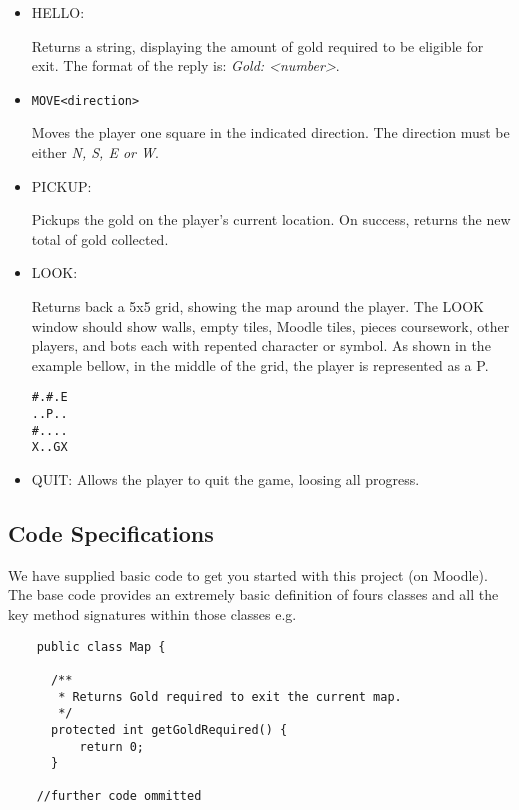 \documentclass{article}
\begin{document}
{\renewcommand\labelitemi{}
\begin{itemize}
\item HELLO:

Returns a string, displaying the amount of gold required to be eligible for exit. The format of the reply is: \textit{Gold: <number>}.

\item \begin{verbatim}MOVE<direction>\end{verbatim}

Moves the player one square in the indicated direction. The direction must be either \textit{N, S, E or W}.

\item PICKUP:

Pickups the gold on the player's current location. On success, returns the new total of gold collected.

\item LOOK:

Returns back a 5x5 grid, showing the map around the player. The LOOK window should show walls, empty tiles, Moodle tiles, pieces coursework, other players, and bots each with repented character or symbol. As shown in the example bellow, in the middle of the grid, the player is represented as a P.

\begin{verbatim}
#.#.E
..P..
#....
X..GX
\end{verbatim}

\item QUIT:
Allows the player to quit the game, loosing all progress.
\end{itemize}

\subsection{Code Specifications}
We have supplied basic code to get you started with this project (on Moodle). The base code provides an extremely basic definition of fours classes and all the key method signatures within those classes e.g.

\begin{lstlisting}
    public class Map {

      /**
       * Returns Gold required to exit the current map.
       */
      protected int getGoldRequired() {
          return 0;
      }
    
    //further code ommitted
\end{lstlisting}

}
\end{document}
